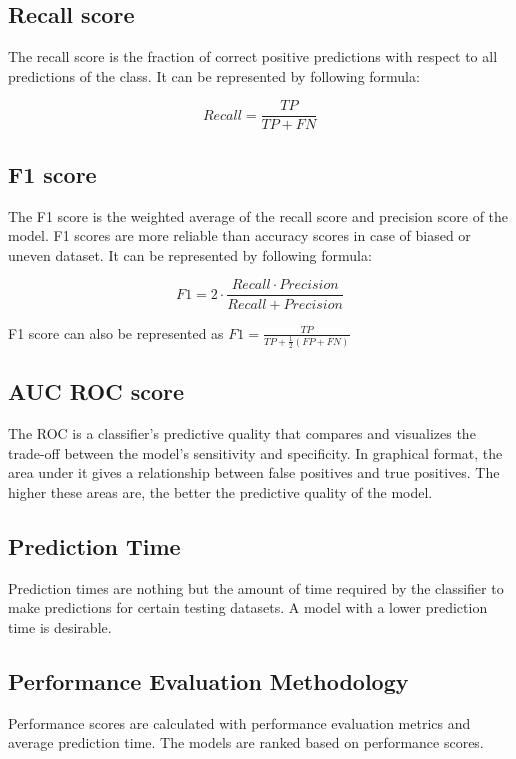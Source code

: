 \subsection{Recall score}\label{subsec:recall_score}
The recall score is the fraction of correct positive predictions with respect to all predictions of the class. It can be represented by following formula:

\begin{equation}\label{eq:recall_score}
  Recall = \frac{TP}{TP+FN}
\end{equation}

\subsection{F1 score}\label{subsec:f1_score}
The F1 score is the weighted average of the recall score and precision score of the model. F1 scores are more reliable than accuracy scores in case of biased or uneven dataset. It can be represented by following formula:

\begin{equation}\label{eq:f1_score}
  F1 = 2 \cdot \frac{Recall \cdot Precision}{Recall + Precision}
\end{equation}

F1 score can also be represented as
$F1 = \frac{TP}{TP+\frac{1}{2}(FP+FN)}$

\subsection{AUC ROC score}\label{subsec:auc_roc_score}
The ROC is a classifier's predictive quality that compares and visualizes the trade-off between the model's sensitivity and specificity. In graphical format, the area under it gives a relationship between false positives and true positives. The higher these areas are, the better the predictive quality of the model.

\subsection{Prediction Time}\label{subsec:prediction_time}
Prediction times are nothing but the amount of time required by the classifier to make predictions for certain testing datasets. A model with a lower prediction time is desirable.

\subsection{Performance Evaluation Methodology} \label{subsec:performance_evaluation_methodology}
Performance scores are calculated with performance evaluation metrics and average prediction time. The models are ranked based on performance scores.

